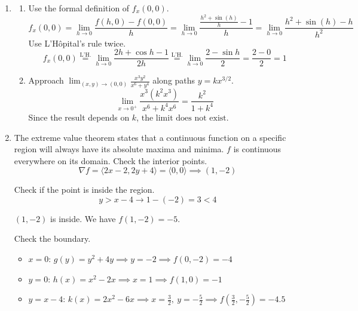 \documentclass[a4paper, 12pt]{article}
\begin{document}
\begin{enumerate}[leftmargin=*,label=\textbf{\arabic*.}]
Since $\det(J)=2\cdot2-1\cdot0=4\neq0$, the system defines $u, v$ implicitly near $P$. Differentiate with respect to $y$.
\begin{align*}
    2u \frac{\partial u}{\partial y} + \frac{\partial v}{\partial y} + \cos(1) &= 0 \implies 2\frac{\partial u}{\partial y} + \frac{\partial v}{\partial y} = -\cos(1) \\
    2\frac{\partial v}{\partial y} + 1 &= 0 \implies \frac{\partial v}{\partial y} = -\frac{1}{2}
\end{align*}

Substitute $\frac{\partial v}{\partial y}$.

\[\boxed{\frac{\partial u}{\partial y} = \frac{1 - 2\cos(1)}{4}}\]

\item \begin{enumerate}[label=\textbf{\alph*.}]
    \item Use the formal definition of $f_x(0,0)$.
    \[f_x(0,0) = \lim_{h \to 0} \frac{f(h,0) - f(0,0)}{h} = \lim_{h \to 0} \frac{\frac{h^2 + \sin(h)}{h} - 1}{h} = \lim_{h \to 0} \frac{h^2 + \sin(h) - h}{h^2}\]
    Use L'Hôpital's rule twice.
    \[f_x(0,0) \overset{\text{L'H.}}= \lim_{h\to0}\frac{2h+\cos h-1}{2h}\overset{\text{L'H.}}= \lim_{h\to0}\frac{2-\sin h}{2}=\frac{2-0}2=\boxed1\]
    \item Approach $\displaystyle\lim_{(x,y)\to(0,0)} \frac{x^3 y^2}{x^6 + y^4}$ along paths $y = k x^{3/2}$.
    \[\lim_{x \to 0^+} \frac{x^3 (k^2 x^3)}{x^6 + k^4 x^6} = \frac{k^2}{1 + k^4}\]
    Since the result depends on $k$, $\boxed{\text{the limit does not exist}}$.
\end{enumerate}

\item The extreme value theorem states that a continuous function on a specific region will always have its absolute maxima and minima. $f$ is continuous everywhere on its domain. Check the interior points.
\[\nabla f = \langle 2x - 2, 2y + 4 \rangle = \langle 0, 0 \rangle \implies (1, -2)\]

Check if the point is inside the region.
\[y > x -4\longrightarrow 1 - (-2) = 3 < 4\]

$(1,-2)$ is inside. We have $f(1,-2) = -5$.

Check the boundary.
\begin{itemize}[leftmargin=*]
    \item $x=0$: $g(y) = y^2 + 4y \implies y = -2 \implies f(0,-2) = -4$
    \item $y=0$: $h(x) = x^2 - 2x \implies x = 1 \implies f(1,0) = -1$
    \item $y = x - 4$: $k(x) = 2x^2 - 6x \implies x = \frac{3}{2},\: y = -\frac{5}{2} \implies f\left(\frac{3}{2}, -\frac{5}{2}\right) = -4.5$
\end{itemize}


\end{enumerate}
\end{document}
